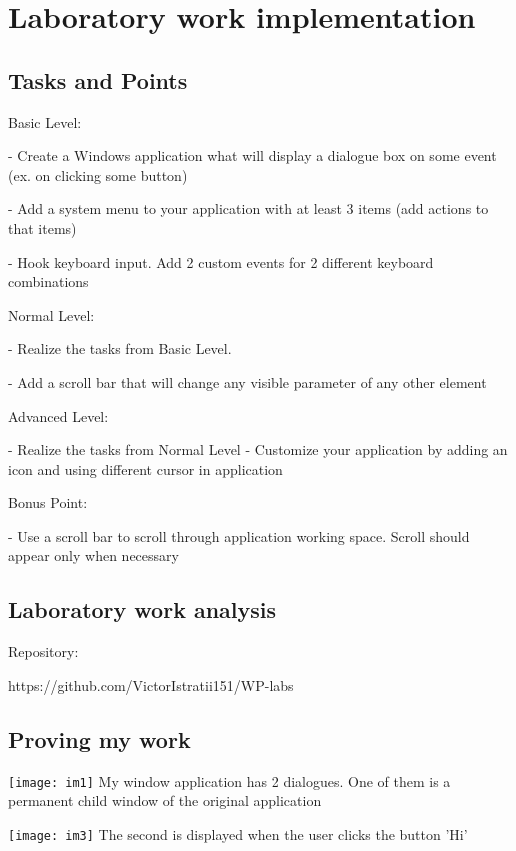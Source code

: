 \section{Laboratory work implementation}

\subsection{Tasks and Points}

Basic Level:

    - Create a Windows application what will display a dialogue box on some event (ex. on clicking some button)
    
    - Add a system menu to your application with at least 3 items (add actions to that items)
   
    - Hook keyboard input. Add 2 custom events for 2 different keyboard combinations


Normal Level:

    - Realize the tasks from Basic Level.

    - Add a scroll bar that will change any visible parameter of any other element 


Advanced Level:

	- Realize the tasks from Normal Level
	- Customize your application by adding an icon and using different cursor in application

Bonus Point:
	
	- Use a scroll bar to scroll through application working space. Scroll should appear only when necessary

\subsection{Laboratory work analysis}

Repository:

https://github.com/VictorIstratii151/WP-labs

\subsection{Proving my work}

\texttt{[image: im1]}
My window application has 2 dialogues. One of them is a permanent child window of the original application



\texttt{[image: im3]}
The second is displayed when the user clicks the button 'Hi'



